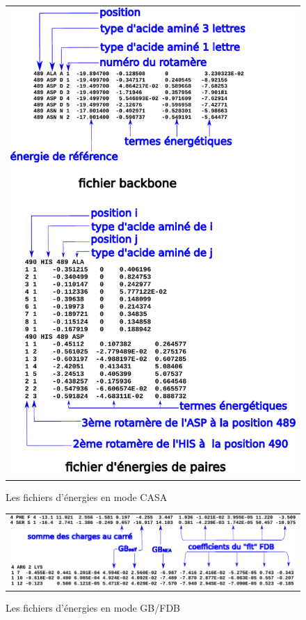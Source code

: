    \begin{figure}[!htbp]
     \centering
     \begin{tabular}{c}
       \includegraphics[width=12cm]{figure/inputener.pdf} 
     \end{tabular}     
     \caption{Les fichiers d'énergies en mode CASA}
\label{fig:CAenerfile}
   \end{figure}

   \begin{figure}[!htbp]
     \centering
     \begin{tabular}{c}
       \includegraphics[width=16cm]{figure/inputenerFDB.pdf} 
     \end{tabular}     
     \caption{Les fichiers d'énergies en mode GB/FDB}
\label{fig:GBenerfile}
   \end{figure} 
   
